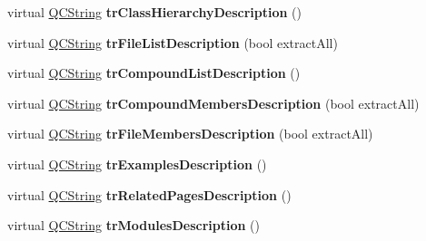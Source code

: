 \begin{DoxyCompactItemize}
\item 
\hypertarget{class_translator_chinese_a7697957dd30cb62ae6635bdd99b828b3}{virtual \hyperlink{class_q_c_string}{Q\-C\-String} {\bfseries tr\-Class\-Hierarchy\-Description} ()}\label{class_translator_chinese_a7697957dd30cb62ae6635bdd99b828b3}

\item 
\hypertarget{class_translator_chinese_adca38ddeb72745fe24c61ff08af9e6c4}{virtual \hyperlink{class_q_c_string}{Q\-C\-String} {\bfseries tr\-File\-List\-Description} (bool extract\-All)}\label{class_translator_chinese_adca38ddeb72745fe24c61ff08af9e6c4}

\item 
\hypertarget{class_translator_chinese_af008bc8cb43ee14946b1671d80099a34}{virtual \hyperlink{class_q_c_string}{Q\-C\-String} {\bfseries tr\-Compound\-List\-Description} ()}\label{class_translator_chinese_af008bc8cb43ee14946b1671d80099a34}

\item 
\hypertarget{class_translator_chinese_ab5fb09f47fa021d41e036d9f41bf741a}{virtual \hyperlink{class_q_c_string}{Q\-C\-String} {\bfseries tr\-Compound\-Members\-Description} (bool extract\-All)}\label{class_translator_chinese_ab5fb09f47fa021d41e036d9f41bf741a}

\item 
\hypertarget{class_translator_chinese_a209311e74b83f8ac8eba8581d8a89eb9}{virtual \hyperlink{class_q_c_string}{Q\-C\-String} {\bfseries tr\-File\-Members\-Description} (bool extract\-All)}\label{class_translator_chinese_a209311e74b83f8ac8eba8581d8a89eb9}

\item 
\hypertarget{class_translator_chinese_a0085d1262f19b68fdad2ad542f24914e}{virtual \hyperlink{class_q_c_string}{Q\-C\-String} {\bfseries tr\-Examples\-Description} ()}\label{class_translator_chinese_a0085d1262f19b68fdad2ad542f24914e}

\item 
\hypertarget{class_translator_chinese_a9343c5fac5dbcf77ba7c31a80cb74846}{virtual \hyperlink{class_q_c_string}{Q\-C\-String} {\bfseries tr\-Related\-Pages\-Description} ()}\label{class_translator_chinese_a9343c5fac5dbcf77ba7c31a80cb74846}

\item 
\hypertarget{class_translator_chinese_aafdd368977a57dc31d200e624a1358ac}{virtual \hyperlink{class_q_c_string}{Q\-C\-String} {\bfseries tr\-Modules\-Description} ()}\label{class_translator_chinese_aafdd368977a57dc31d200e624a1358ac}


\end{DoxyCompactItemize}
